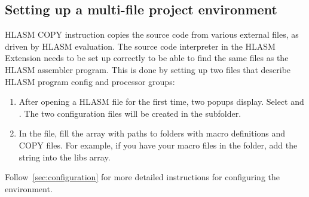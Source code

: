 \subsection{Setting up a multi-file project environment}
HLASM COPY instruction copies the source code from various external files, as driven by HLASM evaluation. The source code interpreter in the HLASM Extension needs to be set up correctly to be able to find the same files as the HLASM assembler program. This is done by setting up two files that describe HLASM program config and processor groups:
\begin{enumerate}
	\item After opening a HLASM file for the first time, two popups display. Select  and . The two configuration files will be created in the  subfolder.
	\item In the  file, fill the  array with paths to folders with macro definitions and COPY files. For example, if you have your macro files in the  folder, add the string  into the libs array.
\end{enumerate}

Follow~\cref{sec:configuration} for more detailed instructions for configuring the environment.
